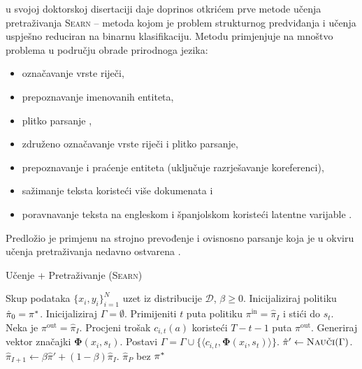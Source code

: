 \citet{daume06thesis} u svojoj doktorskoj disertaciji daje doprinos otkrićem
prve metode učenja pretraživanja \textsc{Searn}  --
metoda kojom je problem strukturnog predviđanja i učenja uspješno reduciran na
binarnu klasifikaciju.
Metodu primjenjuje na mnoštvo problema u području obrade prirodnoga jezika:
\begin{itemize}
  \item označavanje vrste riječi,
  \item prepoznavanje imenovanih entiteta,
  \item plitko parsanje ,
  \item združeno označavanje vrste riječi i plitko parsanje,
  \item prepoznavanje i praćenje entiteta (uključuje razrješavanje koreferenci),
  \item sažimanje teksta koristeći više dokumenata i
  \item poravnavanje teksta na engleskom i španjolskom koristeći latentne
  varijable .
\end{itemize}
Predložio je primjenu na strojno prevođenje i ovisnosno parsanje koja je u
okviru učenja pretraživanja nedavno ostvarena
\citep{he2015syntax,chang2015learning}.

\begin{algorithm}
\caption{Učenje + Pretraživanje (\textsc{Searn})}\label{alg:searn}
\begin{algorithmic}[1]
\Require Skup podataka $\{x_i, y_i\}_{i=1}^N$ uzet iz distribucije $\mathcal{D}$,
  $\beta \geq 0$. %
\State Inicijaliziraj politiku $\hat{\pi}_0 = \pi\ssymbol{1}$.
\ForAll{$I \in \big[0,1,2,\ldots,P)$}
    \State Inicijaliziraj $\Gamma = \emptyset$. 
      \State Primijeniti $t$ puta politiku $\pi^{\text{in}} = \hat{\pi}_{I}$  i stići do $s_t$. 
      \label{alg:searn:action}
        \State Neka je  $\pi^{\text{out}} = \hat{\pi}_{I}$.\label{alg:searn:rolloutpolicy}
        \State Procjeni trošak $c_{i,t}(a)$ koristeći $T-t-1$ puta $\pi^{\text{out}}$. \label{alg:searn:rollout}
      \EndFor
      \State Generiraj vektor značajki $\mathbf{\Phi}(x_i, s_t)$.
      \State Postavi $\Gamma = \Gamma \cup \{\langle c_{i,t}, \mathbf{\Phi}(x_i, s_t) \rangle\}$.
    \EndFor
  \EndFor
  \State $\hat{\pi}' \gets \textsc{Nauči}(\Gamma)$.\label{alg:searn:train}
  \State $\hat{\pi}_{I+1} \gets \beta \hat{\pi}' + (1-\beta) \hat{\pi}_{I}$. \label{alg:searn:mixture}
\EndFor
\State \Return $\hat{\pi}_{P}$ bez $\pi\ssymbol{1}$
\end{algorithmic}
\end{algorithm}

